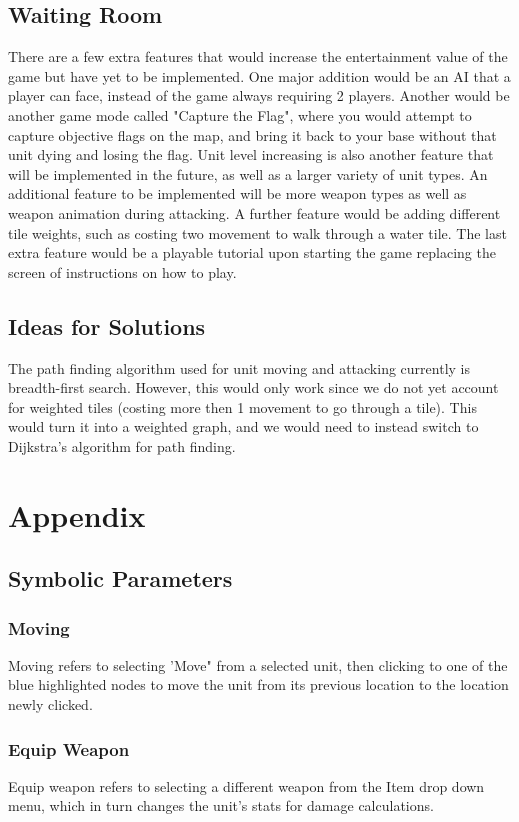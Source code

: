 \documentclass{article}
\begin{document}
\subsection{Waiting Room}
There are a few extra features that would increase the entertainment value of the game but have yet to be implemented. One major addition would be an AI that a player can face, instead of the game always requiring 2 players. Another would be another game mode called "Capture the Flag", where you would attempt to capture objective flags on the map, and bring it back to your base without that unit dying and losing the flag. Unit level increasing is also another feature that will be implemented in the future, as well as a larger variety of unit types. An additional feature to be implemented will be more weapon types as well as weapon animation during attacking. A further feature would be adding different tile weights, such as costing two movement to walk through a water tile. The last extra feature would be a playable tutorial upon starting the game replacing the screen of instructions on how to play.

\subsection{Ideas for Solutions}
The path finding algorithm used for unit moving and attacking currently is breadth-first search. However, this would only work since we do not yet account for weighted tiles (costing more then 1 movement to go through a tile). This would turn it into a weighted graph, and we would need to instead switch to Dijkstra's algorithm for path finding.

\section{Appendix}

\subsection{Symbolic Parameters} \label{Actions}

\subsubsection{Moving}
Moving refers to selecting 'Move" from a selected unit, then clicking to one of the blue highlighted nodes to move the unit from its previous location to the location newly clicked.

\subsubsection{Equip Weapon}
Equip weapon refers to selecting a different weapon from the Item drop down menu, which in turn changes the unit's stats for damage calculations.
\end{document}
